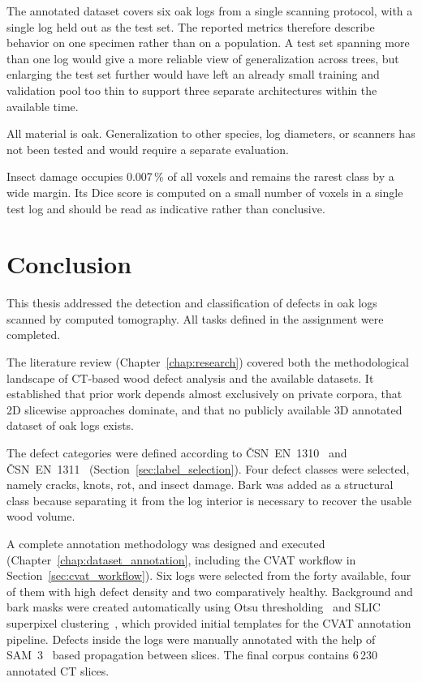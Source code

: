 The annotated dataset covers six oak logs from a single scanning protocol, with a single log held out as the test set. The reported metrics therefore describe behavior on one specimen rather than on a population. A test set spanning more than one log would give a more reliable view of generalization across trees, but enlarging the test set further would have left an already small training and validation pool too thin to support three separate architectures within the available time.

All material is oak. Generalization to other species, log diameters, or scanners has not been tested and would require a separate evaluation.

Insect damage occupies 0.007\,\% of all voxels and remains the rarest class by a wide margin. Its Dice score is computed on a small number of voxels in a single test log and should be read as indicative rather than conclusive.

\chapter*{Conclusion}

This thesis addressed the detection and classification of defects in oak logs scanned by computed tomography. All tasks defined in the assignment were completed.

The literature review (Chapter~\ref{chap:research}) covered both the methodological landscape of CT-based wood defect analysis and the available datasets. It established that prior work depends almost exclusively on private corpora, that 2D slicewise approaches dominate, and that no publicly available 3D annotated dataset of oak logs exists.

The defect categories were defined according to ČSN~EN~1310~\cite{csnen1310} and ČSN~EN~1311~\cite{csnen1311} (Section~\ref{sec:label_selection}). Four defect classes were selected, namely cracks, knots, rot, and insect damage. Bark was added as a structural class because separating it from the log interior is necessary to recover the usable wood volume.

A complete annotation methodology was designed and executed (Chapter~\ref{chap:dataset_annotation}, including the CVAT workflow in Section~\ref{sec:cvat_workflow}). Six logs were selected from the forty available, four of them with high defect density and two comparatively healthy. Background and bark masks were created automatically using Otsu thresholding~\cite{otsu1979threshold} and SLIC superpixel clustering~\cite{achanta2012slic}, which provided initial templates for the CVAT annotation pipeline. Defects inside the logs were manually annotated with the help of SAM~3~\cite{sam3} based propagation between slices. The final corpus contains 6\,230 annotated CT slices.

